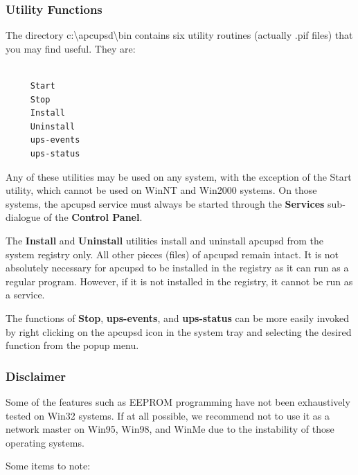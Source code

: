 {{{{{{{{{{\label{Utility-Functions}

\subsubsection*{Utility Functions}

The directory c:\textbackslash{}apcupsd\textbackslash{}bin contains six
utility routines (actually .pif files) that you may find useful. They are: 

\footnotesize
\begin{verbatim}
     
     Start
     Stop
     Install
     Uninstall
     ups-events
     ups-status
\end{verbatim}
\normalsize

Any of these utilities may be used on any system, with the exception of the
Start utility, which cannot be used on WinNT and Win2000 systems. On those
systems, the apcupsd service must always be started through the {\bf Services}
sub-dialogue of the {\bf Control Panel}.  

The {\bf Install} and {\bf Uninstall} utilities install and uninstall apcupsd
from the system registry only. All other pieces (files) of apcupsd remain
intact. It is not absolutely necessary for apcupsd to be installed in the
registry as it can run as a regular program. However, if it is not installed
in the registry, it cannot be run as a service.  

The functions of {\bf Stop}, {\bf ups-events}, and {\bf ups-status} can be
more easily invoked by right clicking on the apcupsd icon in the system tray
and selecting the desired function from the popup menu. 

\label{Disclaimer}

\subsubsection*{Disclaimer}

\label{index-Disclaimer-180}
Some of the features such as EEPROM programming have not been exhaustively
tested on Win32 systems. If at all possible, we recommend not to use it as a
network master on Win95, Win98, and WinMe due to the instability of those
operating systems.  

Some items to note:  

}}}}}}}}}}
